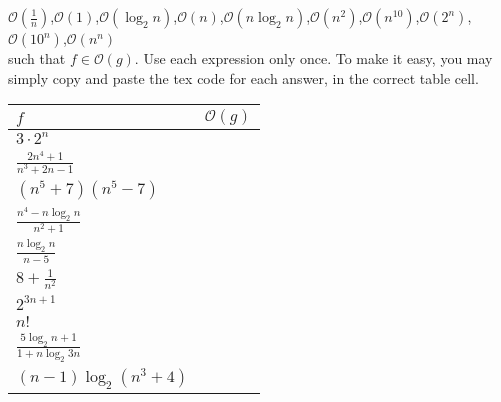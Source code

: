 \documentclass[12pt]{article}
\begin{document}
$\mathcal{O}(\frac{1}{n})$,$\mathcal{O}(1)$,$\mathcal{O}(\log_2{n})$,$\mathcal{O}(n)$,$\mathcal{O}(n\log_2{n})$,$\mathcal{O}(n^2)$,$\mathcal{O}(n^{10})$,$\mathcal{O}(2^n)$,$\mathcal{O}(10^n)$,$\mathcal{O}(n^n)$\\


such that $f\in\mathcal{O}(g)$. Use each expression only once. To make it easy, you may simply copy and paste the tex code for each answer, in the correct table cell.

\vskip10pt

\begin{tabular}{|l|l|}
\hline
$f$&$\mathcal{O}(g)$\\
\hline
$3\cdot 2^n$&\\
\hline
$\frac{2n^4+1}{n^3+2n-1}$&\\
\hline
$(n^5+7)(n^5-7)$&\\
\hline
$\frac{n^4-n\log_2{n}}{n^2+1}$&\\
\hline
$\frac{n\log_2{n}}{n-5}$&\\
\hline
$8+\frac{1}{n^2}$&\\
\hline
$2^{3n+1}$&\\
\hline
$n!$&\\
\hline
$\frac{5\log_2{n+1}}{1+n\log_2{3n}}$&\\
\hline
$(n-1)\log_2(n^3+4)$&\\
\hline
\end{tabular}



\end{document}
